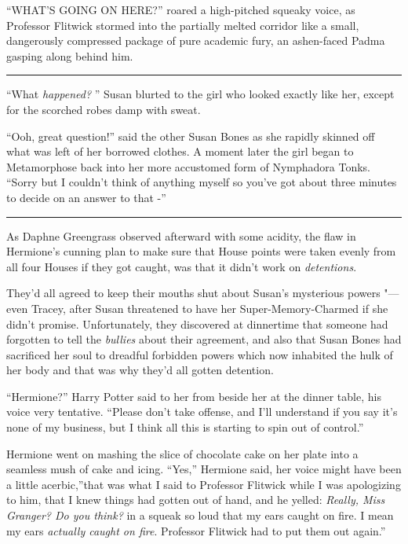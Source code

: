 ``WHAT'S GOING ON HERE?'' roared a high-pitched squeaky voice, as
Professor Flitwick stormed into the partially melted corridor like a
small, dangerously compressed package of pure academic fury, an
ashen-faced Padma gasping along behind him.

\begin{center}\rule{3in}{0.4pt}\end{center}

``What \emph{happened?} '' Susan blurted to the girl who looked exactly
like her, except for the scorched robes damp with sweat.

``Ooh, great question!'' said the other Susan Bones as she rapidly
skinned off what was left of her borrowed clothes. A moment later the
girl began to Metamorphose back into her more accustomed form of
Nymphadora Tonks. ``Sorry but I couldn't think of anything myself so
you've got about three minutes to decide on an answer to that -''

\begin{center}\rule{3in}{0.4pt}\end{center}

As Daphne Greengrass observed afterward with some acidity, the flaw in
Hermione's cunning plan to make sure that House points were taken evenly
from all four Houses if they got caught, was that it didn't work on
\emph{detentions}.

They'd all agreed to keep their mouths shut about Susan's mysterious
powers "--- even Tracey, after Susan threatened to have her
Super-Memory-Charmed if she didn't promise. Unfortunately, they
discovered at dinnertime that someone had forgotten to tell the
\emph{bullies} about their agreement, and also that Susan Bones had
sacrificed her soul to dreadful forbidden powers which now inhabited the
hulk of her body and that was why they'd all gotten detention.

``Hermione?'' Harry Potter said to her from beside her at the dinner
table, his voice very tentative. ``Please don't take offense, and I'll
understand if you say it's none of my business, but I think all this is
starting to spin out of control.''

Hermione went on mashing the slice of chocolate cake on her plate into a
seamless mush of cake and icing. ``Yes,'' Hermione said, her voice might
have been a little acerbic,''that was what I said to Professor Flitwick
while I was apologizing to him, that I knew things had gotten out of
hand, and he yelled: \emph{Really, Miss Granger? Do you think?} in a
squeak so loud that my ears caught on fire. I mean my ears
\emph{actually caught on fire}. Professor Flitwick had to put them out
again.''

